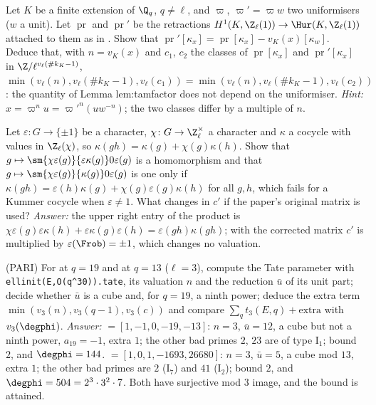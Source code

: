 \begin{exercise}\label{ex:galcoh:ex-uniformiser}
Let $K$ be a finite extension of $\Q_q$, $q\ne\ell$, and $\varpi$, $\varpi'=\varpi w$ two uniformisers ($w$ a unit). Let $\operatorname{pr}$ and $\operatorname{pr}'$ be the retractions
$H^1(K,\Z_\ell(1))\to\Hur(K,\Z_\ell(1))$ attached to them as in . Show that $\operatorname{pr}'[\kappa_x]=\operatorname{pr}[\kappa_x]-v_K(x)[\kappa_w]$.
Deduce that, with $n=v_K(x)$ and $c_1$, $c_2$ the classes of $\operatorname{pr}[\kappa_x]$ and $\operatorname{pr}'[\kappa_x]$ in $\Z/\ell^{v_\ell(\#k_K-1)}$,
$\min(v_\ell(n),v_\ell(\#k_K-1),v_\ell(c_1))=\min(v_\ell(n),v_\ell(\#k_K-1),v_\ell(c_2))$: the quantity of Lemma lem:tamfactor does not depend on the uniformiser. \emph{Hint:} $x=\varpi^nu=\varpi'^n(uw^{-n})$; the two classes differ by a multiple of $n$.
\end{exercise}

\begin{exercise}\label{ex:galcoh:ex-corner}
Let $\varepsilon\colon G\to\{\pm1\}$ be a character, $\chi\colon G\to\Z_\ell^\times$ a character and $\kappa$ a cocycle with values in $\Z_\ell(\chi)$, so $\kappa(gh)=\kappa(g)+\chi(g)\kappa(h)$.
Show that $g\mapsto\sm{\chi\varepsilon(g)}{\varepsilon\kappa(g)}0{\varepsilon(g)}$ is a homomorphism and that $g\mapsto\sm{\chi\varepsilon(g)}{\kappa(g)}0{\varepsilon(g)}$ is one only if $\kappa(gh)=\varepsilon(h)\kappa(g)+\chi(g)\varepsilon(g)\kappa(h)$
for all $g,h$, which fails for a Kummer cocycle when $\varepsilon\ne1$. What changes in $c'$ if the paper's original matrix is used? \emph{Answer:} the upper right entry of the
product is $\chi\varepsilon(g)\varepsilon\kappa(h)+\varepsilon\kappa(g)\varepsilon(h)=\varepsilon(gh)\kappa(gh)$; with the corrected matrix $c'$ is multiplied by $\varepsilon(\Frob)=\pm1$, which changes no valuation.
\end{exercise}

\begin{exercise}\label{ex:galcoh:ex-pari-tate}
(PARI) For  at $q=19$ and  at $q=13$ ($\ell=3$), compute the Tate parameter with \texttt{ellinit(E,O(q\^{}30)).tate}, its valuation $n$ and the reduction
$\bar u$ of its unit part; decide whether $\bar u$ is a cube and, for $q=19$, a ninth power; deduce the extra term $\min(v_3(n),v_3(q-1),v_3(c))$ and compare
$\sum_qt_3(E,q)+\text{extra}$ with $v_3(\degphi)$. \emph{Answer:}  $=[1,-1,0,-19,-13]$: $n=3$, $\bar u=12$, a cube but not a ninth power, $a_{19}=-1$, extra $1$; the
other bad primes $2$, $23$ are of type $\mathrm I_1$; bound $2$, and $\degphi=144$.  $=[1,0,1,-1693,26680]$: $n=3$, $\bar u=5$, a cube mod $13$, extra $1$; the
other bad primes are $2$ ($\mathrm I_7$) and $41$ ($\mathrm I_2$); bound $2$, and $\degphi=504=2^3\cdot3^2\cdot7$. Both have surjective mod $3$ image, and the bound is attained.
\end{exercise}

